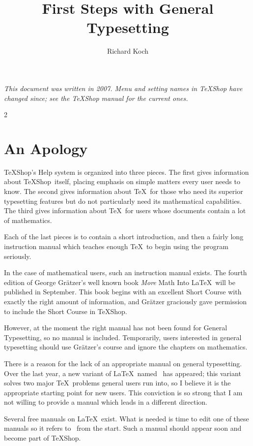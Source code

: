 \documentclass[11pt, oneside]{amsart}
\title{First Steps with General Typesetting }
\author{Richard Koch}
\newcommand{\TS}{TeXShop}
\begin{document}
\maketitle
\noindent\textit{This document was written in 2007. Menu and setting names in TeXShop have changed since; see the TeXShop manual for the current ones.}

\begin{multicols}{2}
\thispagestyle{empty}

\section{An Apology}

\TS's Help system is organized into three pieces. The first gives information about \TS\ itself, placing emphasis on simple matters every user needs to know.   The second gives information about \TeX\ for those who need its superior typesetting features but do not particularly need its mathematical capabilities. The third gives information about \TeX\ for users whose documents contain a lot of mathematics. 

Each of the last pieces is to contain a short introduction, and then a fairly long instruction manual which teaches enough \TeX\ to begin using the program seriously.

In the case of mathematical users, such an instruction manual exists.  The fourth edition of George Gr\"atzer's well known book \emph{More} Math Into \LaTeX\ will be published in September. This book begins with an excellent Short Course with exactly the right amount of information, and Gr\"atzer graciously gave permission to include the Short Course in  \TS.

However, at the moment the right manual has not been found  for  General Typesetting, so no manual is included. Temporarily, users interested in general typesetting should use Gr\"atzer's course and ignore the chapters on mathematics.

There is a reason for the lack of an appropriate manual on general typesetting. Over the last year, a new variant of \LaTeX\ named \XeLaTeX\ has appeared; this variant solves two major \TeX\ problems general users run into, so I believe it is the appropriate starting point for new users. This conviction is so strong that I am not  willing to provide a manual which leads in a different direction.

Several free manuals on \LaTeX\ exist. What is needed is time to edit one of these manuals so it refers to \XeLaTeX\ from the start. Such a manual should appear soon and become part of \TS.


\end{multicols}
\end{document}

